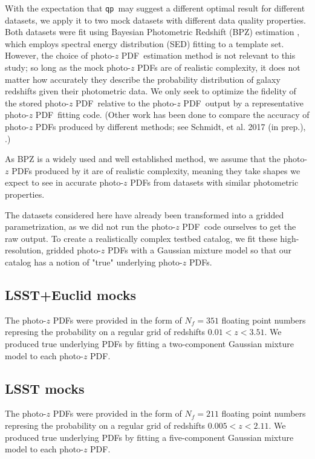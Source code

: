 \documentclass[\docopts]{\docclass}
\newcommand{\qp}{\texttt{qp}}
\newcommand{\pz}{photo-$z$ PDF}
\begin{document}
With the expectation that \qp\  may suggest a different optimal result for 
different datasets, we apply it to two mock datasets with different data 
quality properties.  Both datasets were fit using Bayesian Photometric Redshift 
(BPZ) estimation \citep{benitez_bayesian_2000}, which employs spectral energy 
distribution (SED) fitting to a template set.  However, the choice of \pz\ 
estimation method is not relevant to this study; so long as the mock \pz s are 
of realistic complexity, it does not matter how accurately they describe the 
probability distribution of galaxy redshifts given their photometric data.  We 
only seek to optimize the fidelity of the stored \pz\ relative to the \pz\ 
output by a representative \pz\ fitting code.  (Other work has been done to 
compare the accuracy of \pz s produced by different methods; see Schmidt, et 
al. 2017 (in prep.), \citet{tanaka_photometric_2017}.)

As BPZ is a widely used and well established method, we assume that the \pz s 
produced by it are of realistic complexity, meaning they take shapes we expect 
to see in accurate \pz s from datasets with similar photometric properties.

The datasets considered here have already been transformed into a gridded 
parametrization, as we did not run the \pz\ code ourselves to get the raw 
output.  To create a realistically complex testbed catalog, we fit these 
high-resolution, gridded \pz s with a Gaussian mixture model so that our 
catalog has a notion of "true" underlying \pz s.

\subsection{LSST+Euclid mocks}
\label{sec:mg}


The \pz s were provided in the form of $N_{f}=351$ floating point numbers 
represing the probability on a regular grid of redshifts $0.01 < z < 3.51$.  We 
produced true underlying PDFs by fitting a two-component Gaussian mixture model 
to each \pz.

\subsection{LSST mocks}
\label{sec:ss}


The \pz s were provided in the form of $N_{f}=211$ floating point numbers 
represing the probability on a regular grid of redshifts $0.005 < z < 2.11$.  
We produced true underlying PDFs by fitting a five-component Gaussian mixture 
model to each \pz.
\end{document}
